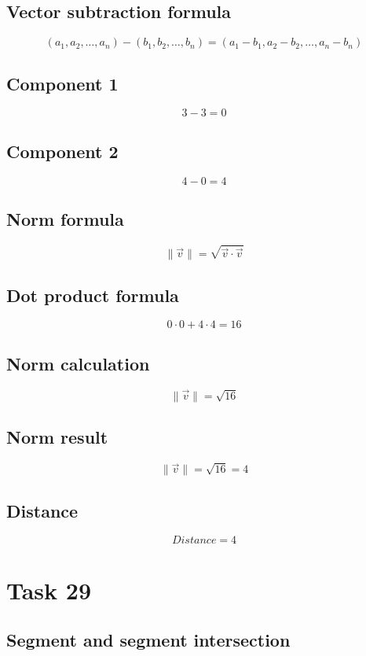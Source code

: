 \documentclass{article}
\begin{document}
\subsection*{ \vspace{1em} Vector subtraction formula}
\[
(a_1, a_2, \dots, a_n) - (b_1, b_2, \dots, b_n) = (a_1 - b_1, a_2 - b_2, \dots, a_n - b_n)
\]
\subsection*{ \vspace{1em} Component 1}
\[
3 - 3 = 0
\]
\subsection*{ \vspace{1em} Component 2}
\[
4 - 0 = 4
\]
\subsection*{ \vspace{1em} Norm formula}
\[
\|\vec{v}\| = \sqrt{\vec{v} \cdot \vec{v}}
\]
\subsection*{ \vspace{1em} Dot product formula}
\[
0 \cdot 0 + 4 \cdot 4 = 16
\]
\subsection*{ \vspace{1em} Norm calculation}
\[
\|\vec{v}\| = \sqrt{16}
\]
\subsection*{ \vspace{1em} Norm result}
\[
\|\vec{v}\| = \sqrt{16} = 4
\]
\subsection*{ \vspace{1em} Distance}
\[
Distance = 4
\]
\bigskip

\hrulefill
\bigskip

\section*{Task 29}

\subsection*{Segment and segment intersection}
\end{document}
